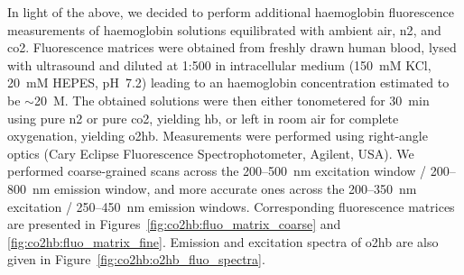 In light of the above, we decided to perform additional haemoglobin fluorescence measurements of haemoglobin solutions equilibrated with ambient air, \gls{n2}, and \gls{co2}. Fluorescence matrices were obtained from freshly drawn human blood, lysed with ultrasound and diluted at 1:500 in intracellular medium (150~mM KCl, 20~mM HEPES, pH~7.2) leading to an haemoglobin concentration estimated to be $\sim$20~\textmu{}M. The obtained solutions were then either tonometered for 30~min using pure \gls{n2} or pure \gls{co2}, yielding \gls{hb}, or left in room air for complete oxygenation, yielding \gls{o2hb}. Measurements were performed using right-angle optics (Cary Eclipse Fluorescence Spectrophotometer, Agilent, USA). We performed coarse-grained scans across the 200--500~nm excitation window / 200--800~nm emission window, and more accurate ones across the 200--350~nm excitation / 250--450~nm emission windows. Corresponding fluorescence matrices are presented in Figures~\ref{fig:co2hb:fluo_matrix_coarse} and \ref{fig:co2hb:fluo_matrix_fine}. Emission and excitation spectra of \gls{o2hb} are also given in Figure~\ref{fig:co2hb:o2hb_fluo_spectra}.

